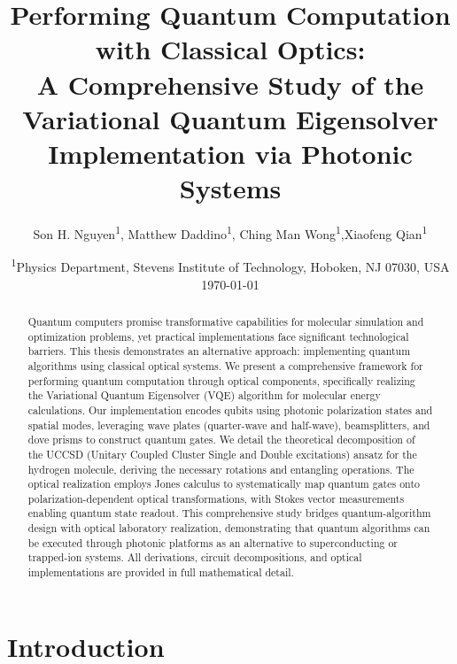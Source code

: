\documentclass[
	a4paper,
	12pt,
	oneside,
]{article}
\title{\textbf{Performing Quantum Computation with Classical Optics: \\[0.5em] A Comprehensive Study of the Variational Quantum Eigensolver Implementation via Photonic Systems}}
\author{Son H. Nguyen\textsuperscript{1}, Matthew Daddino\textsuperscript{1}, Ching Man Wong\textsuperscript{1},Xiaofeng Qian\textsuperscript{1}}
\date{\textsuperscript{1}Physics Department, Stevens Institute of Technology, Hoboken, NJ 07030, USA \\[1em] \today}
\begin{document}
\maketitle


\begin{abstract}
\noindent Quantum computers promise transformative capabilities for molecular simulation and optimization problems, yet practical implementations face significant technological barriers. This thesis demonstrates an alternative approach: implementing quantum algorithms using classical optical systems. We present a comprehensive framework for performing quantum computation through optical components, specifically realizing the Variational Quantum Eigensolver (VQE) algorithm for molecular energy calculations. Our implementation encodes qubits using photonic polarization states and spatial modes, leveraging wave plates (quarter-wave and half-wave), beamsplitters, and dove prisms to construct quantum gates. We detail the theoretical decomposition of the UCCSD (Unitary Coupled Cluster Single and Double excitations) ansatz for the hydrogen molecule, deriving the necessary rotations and entangling operations. The optical realization employs Jones calculus to systematically map quantum gates onto polarization-dependent optical transformations, with Stokes vector measurements enabling quantum state readout. This comprehensive study bridges quantum-algorithm design with optical laboratory realization, demonstrating that quantum algorithms can be executed through photonic platforms as an alternative to superconducting or trapped-ion systems. All derivations, circuit decompositions, and optical implementations are provided in full mathematical detail.
\end{abstract}

\clearpage
\tableofcontents
\clearpage


\section{Introduction}
\end{document}
